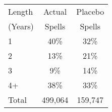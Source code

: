 \begin{tabular}{lcc}
\toprule
Length & Actual & Placebo \\
(Years) & Spells & Spells \\
\midrule
1 & 40\% & 32\% \\
2 & 13\% & 21\% \\
3 & 9\% & 14\% \\
4+ & 38\% & 33\% \\
Total &      499,064 &      159,747 \\
\bottomrule
\end{tabular}

